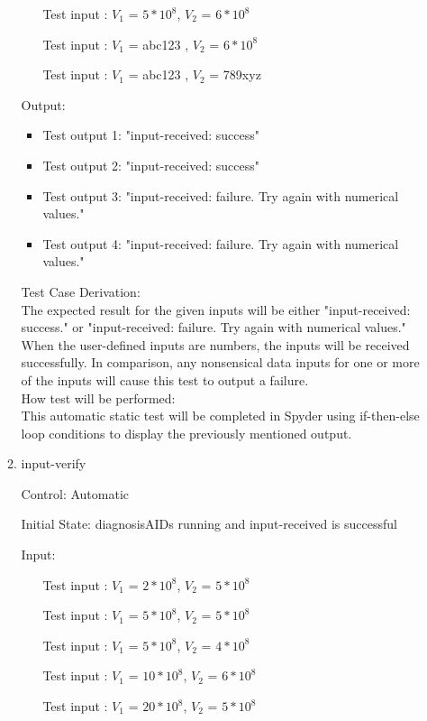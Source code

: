\documentclass[12pt, titlepage]{article}
\newcounter{tinnum} %
\begin{document}
\begin{enumerate}
\begin{enumerate}
\begin{itemize}
\item[Test input \refstepcounter{tinnum}\thetinnum\label{Tinput_4}:] $V_1$ = $5*10^8$, $V_2$ = $6*10^8$%

\item[Test input \refstepcounter{tinnum}\thetinnum\label{Tinput_5}:] $V_1$ = abc123 , $V_2$ = $6*10^8$  
\item[Test input \refstepcounter{tinnum}\thetinnum\label{Tinput_6}:] $V_1$ = abc123 , $V_2$ = 789xyz 
\end{itemize}

Output: 
\begin{itemize}
\item Test output 1: "input-received: success"
\item Test output 2: "input-received: success" 
\item Test output 3: "input-received: failure. Try again with numerical values."
\item Test output 4: "input-received: failure. Try again with numerical values."
\end{itemize}

Test Case Derivation:\\
The expected result for the given inputs will be either 
"input-received: success." or  "input-received: failure. Try again with 
numerical values." When the user-defined inputs are numbers, the inputs will be 
received successfully. In comparison, any nonsensical data inputs for one or 
more of the inputs will cause this test to output a failure.\\

How test will be performed: \\
This automatic static test will be completed in Spyder using if-then-else loop 
conditions to display the previously mentioned output. \\

					
\item{input-verify\\}

Control: Automatic
					
Initial State: diagnosisAIDs running and input-received is successful
					
Input:
\begin{itemize} %
\item[Test input \refstepcounter{tinnum}\thetinnum\label{Tinput_7}:] $V_1$ = $2*10^8$, $V_2$ = $5*10^8$ %
\item[Test input \refstepcounter{tinnum}\thetinnum\label{Tinput_8}:]$V_1$ = $5*10^8$, $V_2$ = $5*10^8$%
\item[Test input \refstepcounter{tinnum}\thetinnum\label{Tinput_9}:] $V_1$ = $5*10^8$, $V_2$ = $4*10^8$%
\item[Test input \refstepcounter{tinnum}\thetinnum\label{Tinput_10}:]$V_1$ = $10*10^8$, $V_2$ = $6*10^8$%
\item[Test input \refstepcounter{tinnum}\thetinnum\label{Tinput_11}:]$V_1$ = $20*10^8$, $V_2$ = $5*10^8$%


\end{itemize}
\end{enumerate}
\end{enumerate}
\end{document}
